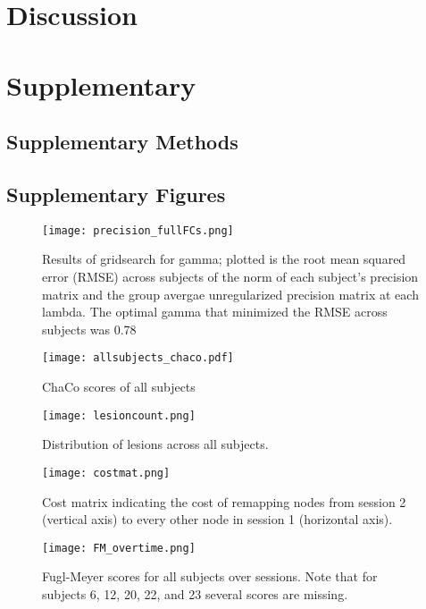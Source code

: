 \documentclass[10pt]{article}
\begin{document}
	\section*{Discussion}
	
	\section*{Supplementary}
	\subsection*{Supplementary Methods}
	\subsection*{Supplementary Figures}
	
	\begin{figure}[h]
		\texttt{[image: precision\_fullFCs.png]}
		\caption{Results of gridsearch for gamma; plotted is the root mean squared error (RMSE) across subjects of the norm of each subject's precision matrix and the group avergae unregularized precision matrix at each lambda. The optimal gamma that minimized the RMSE across subjects was 0.78}
				\centering
	\end{figure}

	\begin{figure}[h]
	\texttt{[image: allsubjects\_chaco.pdf]}
	\caption{ChaCo scores of all subjects}
	\centering
	\end{figure}

	\begin{figure}[h]
	\texttt{[image: lesioncount.png]}
	\caption{Distribution of lesions across all subjects.}
	\centering
	\end{figure}

	\begin{figure}[h]
	\texttt{[image: costmat.png]}
	\caption{Cost matrix indicating the cost of remapping nodes from session 2 (vertical axis) to every other node in session 1 (horizontal axis).}
	\centering
	\end{figure}

	\begin{figure}[h]
	\texttt{[image: FM\_overtime.png]}
	\caption{Fugl-Meyer scores for all subjects over sessions. Note that for subjects 6, 12, 20, 22, and 23 several scores are missing.}	\centering
	\end{figure}
\end{document}
